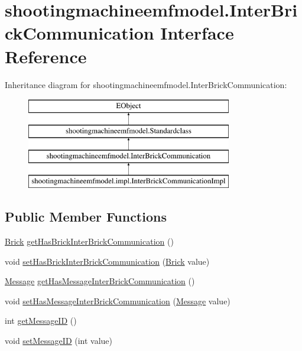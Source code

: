 \hypertarget{interfaceshootingmachineemfmodel_1_1_inter_brick_communication}{\section{shootingmachineemfmodel.\-Inter\-Brick\-Communication Interface Reference}
\label{interfaceshootingmachineemfmodel_1_1_inter_brick_communication}
}
Inheritance diagram for shootingmachineemfmodel.\-Inter\-Brick\-Communication\-:\begin{figure}[H]
\begin{center}
\leavevmode
\includegraphics[height=4.000000cm]{interfaceshootingmachineemfmodel_1_1_inter_brick_communication}
\end{center}
\end{figure}
\subsection*{Public Member Functions}
\begin{DoxyCompactItemize}
\item 
\hyperlink{interfaceshootingmachineemfmodel_1_1_brick}{Brick} \hyperlink{interfaceshootingmachineemfmodel_1_1_inter_brick_communication_aa8fad290e49f96db1dd077f52dbf5261}{get\-Has\-Brick\-Inter\-Brick\-Communication} ()
\item 
void \hyperlink{interfaceshootingmachineemfmodel_1_1_inter_brick_communication_a6a48d356d567f912e0554ec83797522f}{set\-Has\-Brick\-Inter\-Brick\-Communication} (\hyperlink{interfaceshootingmachineemfmodel_1_1_brick}{Brick} value)
\item 
\hyperlink{interfaceshootingmachineemfmodel_1_1_message}{Message} \hyperlink{interfaceshootingmachineemfmodel_1_1_inter_brick_communication_a54f9bd81633aa8a03bb9ace15b613c3a}{get\-Has\-Message\-Inter\-Brick\-Communication} ()
\item 
void \hyperlink{interfaceshootingmachineemfmodel_1_1_inter_brick_communication_a3afa1c737d873b26f6082c1ba47a9043}{set\-Has\-Message\-Inter\-Brick\-Communication} (\hyperlink{interfaceshootingmachineemfmodel_1_1_message}{Message} value)
\item 
int \hyperlink{interfaceshootingmachineemfmodel_1_1_inter_brick_communication_a41d056eedfdbeee649538c4be46eed46}{get\-Message\-I\-D} ()
\item 
void \hyperlink{interfaceshootingmachineemfmodel_1_1_inter_brick_communication_a4b06bae52775967e8a31dd5413ae1412}{set\-Message\-I\-D} (int value)
\end{DoxyCompactItemize}


